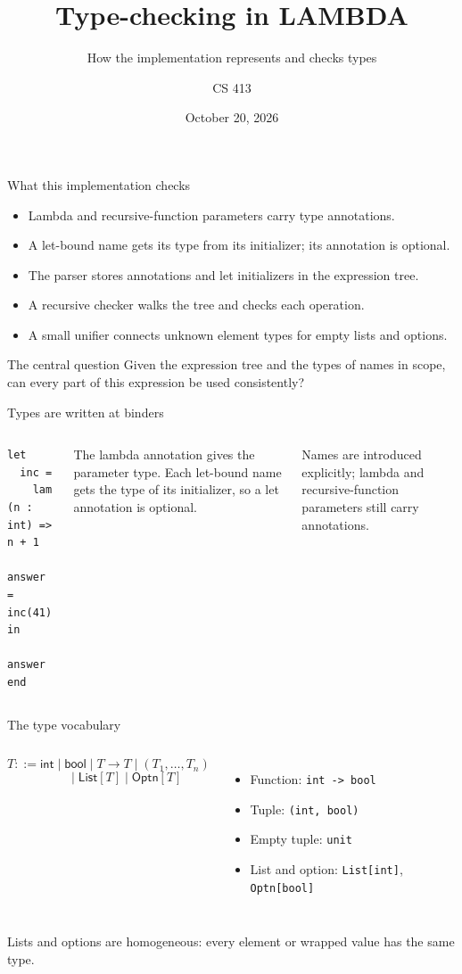 \documentclass[aspectratio=169,11pt]{beamer}
\title[Typed LAMBDA]{Type-checking in LAMBDA}
\subtitle{How the implementation represents and checks types}
\author{CS 413}
\date{October 20, 2026}
\newcommand{\Int}{\mathsf{int}}
\newcommand{\Bool}{\mathsf{bool}}
\newcommand{\ListT}[1]{\mathsf{List}[#1]}
\newcommand{\OptionT}[1]{\mathsf{Optn}[#1]}
\begin{document}
\begin{frame}
  \titlepage
\end{frame}

\begin{frame}{What this implementation checks}
\begin{itemize}
  \item Lambda and recursive-function parameters carry type annotations.
  \item A let-bound name gets its type from its initializer; its annotation is optional.
  \item The parser stores annotations and let initializers in the expression tree.
  \item A recursive checker walks the tree and checks each operation.
  \item A small unifier connects unknown element types for empty lists and options.
\end{itemize}
\begin{block}{The central question}
Given the expression tree and the types of names in scope, can every part of this expression be used consistently?
\end{block}
\end{frame}

\begin{frame}[fragile]{Types are written at binders}
\begin{columns}[T]
\begin{lstlisting}
let
  inc =
    lam (n : int) => n + 1
  answer = inc(41)
in
  answer
end
\end{lstlisting}
The lambda annotation gives the parameter type. Each let-bound name gets the type of its initializer, so a let annotation is optional.
\medskip

Names are introduced explicitly; lambda and recursive-function parameters still carry annotations.
\end{columns}
\end{frame}

\begin{frame}{The type vocabulary}
\begin{columns}[T]
\[
T ::= \Int \mid \Bool \mid T\to T \mid (T_1,\ldots,T_n)
\]
\[
\phantom{T ::=}\mid \ListT{T} \mid \OptionT{T}
\]
\begin{itemize}
  \item Function: \texttt{int -> bool}
  \item Tuple: \texttt{(int, bool)}
  \item Empty tuple: \texttt{unit}
  \item List and option: \texttt{List[int]}, \texttt{Optn[bool]}
\end{itemize}
\end{columns}
\bigskip
Lists and options are homogeneous: every element or wrapped value has the same type.
\end{frame}
\end{document}
